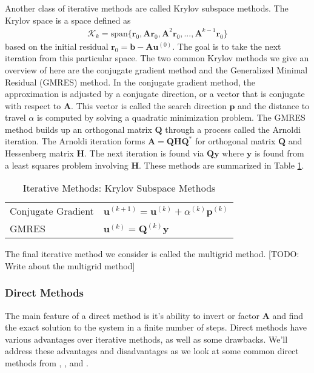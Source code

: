 Another class of iterative methods are called Krylov subspace methods. The Krylov space is a space defined as
\begin{align}
\mathcal{K}_k = \text{span} \{ \textbf{r}_0, \textbf{A} \textbf{r}_0, \textbf{A}^2 \textbf{r}_0, ..., \textbf{A}^{k-1} \textbf{r}_0 \}
\end{align}
based on the initial residual $\textbf{r}_0 = \textbf{b} - \textbf{A} \textbf{u}^{(0)}$. The goal is to take the next iteration from this particular space. The two common Krylov methods we give an overview of here are the conjugate gradient method and the Generalized Minimal Residual (GMRES) method. In the conjugate gradient method, the approximation is adjusted by a conjugate direction, or a vector that is conjugate with respect to $\textbf{A}$. This vector is called the search direction $\textbf{p}$ and the distance to travel $\alpha$ is computed by solving a quadratic minimization problem. The GMRES method builds up an orthogonal matrix $\textbf{Q}$ through a process called the Arnoldi iteration. The Arnoldi iteration forms $\textbf{A} = \textbf{Q} \textbf{H} \textbf{Q}^*$ for orthogonal matrix $\textbf{Q}$ and Hessenberg matrix $\textbf{H}$. The next iteration is found via $\textbf{Q} \textbf{y}$ where $\textbf{y}$ is found from a least squares problem involving $\textbf{H}$. These methods are summarized in Table \ref{tab:ksm}.

\begin{table}[h!]
    \centering
    \begin{tabular}{ | l | l |}
        \hline
        Conjugate Gradient & $\textbf{u}^{(k+1)} = \textbf{u}^{(k)} + \alpha^{(k)} \textbf{p}^{(k)}$ \\
        GMRES & $\textbf{u}^{(k)} = \textbf{Q}^{(k)} \textbf{y}$ \\
        \hline
    \end{tabular}
    \caption{Iterative Methods: Krylov Subspace Methods}
    \label{tab:ksm}
\end{table}

The final iterative method we consider is called the multigrid method. [TODO: Write about the multigrid method]

\subsubsection{Direct Methods}

The main feature of a direct method is it's ability to invert or factor $\textbf{A}$ and find the exact solution to the system in a finite number of steps. Direct methods have various advantages over iterative methods, as well as some drawbacks. We'll address these advantages and disadvantages as we look at some common direct methods from \cite{leveque2007finite}, \cite{martinsson2019fast}, and \cite{trefethen1997numerical}.

